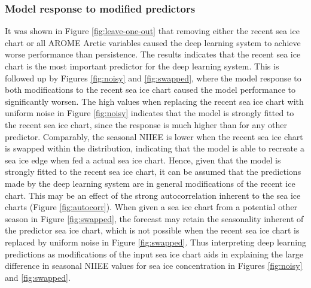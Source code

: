 \documentclass[../main/thesis]{subfiles}
\begin{document}
\subsubsection{Model response to modified predictors}
\label{sec:discuss_model_response}
It was shown in Figure \ref{fig:leave-one-out} that removing either the recent sea ice chart or all AROME Arctic variables caused the deep learning system to achieve worse performance than persistence. The results indicates that the recent sea ice chart is the most important predictor for the deep learning system. This is followed up by Figures \ref{fig:noisy} and \ref{fig:swapped}, where the model response to both modifications to the recent sea ice chart caused the model performance to significantly worsen. The high values when replacing the recent sea ice chart with uniform noise in Figure \ref{fig:noisy} indicates that the model is strongly fitted to the recent sea ice chart, since the response is much higher than for any other predictor. Comparably, the seasonal NIIEE is lower when the recent sea ice chart is swapped within the distribution, indicating that the model is able to recreate a sea ice edge when fed a actual sea ice chart. Hence, given that the model is strongly fitted to the recent sea ice chart, it can be assumed that the predictions made by the deep learning system are in general modifications of the recent ice chart. This may be an effect of the strong autocorrelation inherent to the sea ice charts (Figure \ref{fig:autocorr}). When given a sea ice chart from a potential other season in Figure \ref{fig:swapped}, the forecast may retain the seasonality inherent of the predictor sea ice chart, which is not possible when the recent sea ice chart is replaced by uniform noise in Figure \ref{fig:swapped}. Thus interpreting deep learning predictions as modifications of the input sea ice chart aids in explaining the large difference in seasonal NIIEE values for sea ice concentration in Figures \ref{fig:noisy} and \ref{fig:swapped}.
\end{document}
